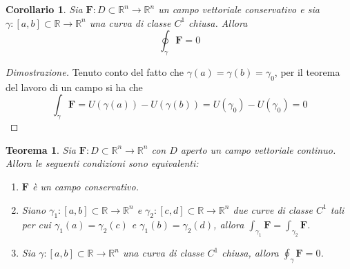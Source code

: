\documentclass{article}
\newtheorem{theorem}{Teorema}
\newtheorem{corollary}{Corollario}[theorem]
\begin{document}
            \begin{corollary}
                Sia $\mathbf{F}: D \subset \mathbb{R}^{n} \rightarrow \mathbb{R}^{n}$ un campo vettoriale conservativo e sia $\gamma: [a, b] \subset \mathbb{R} \rightarrow \mathbb{R}^{n}$ una curva di classe $C^{1}$ chiusa.
                Allora
                \[
                        \oint_{\gamma} \mathbf{F} = 0
                \]
            \end{corollary}

            \begin{proof}[Dimostrazione]
                Tenuto conto del fatto che $\gamma(a) = \gamma(b) = \gamma_{0}$, per il teorema del lavoro di un campo si ha che
                \[
                    \int_{\gamma} \mathbf{F} = U(\gamma(a)) - U(\gamma(b)) = U(\gamma_{0}) - U(\gamma_{0}) = 0
                \]
            \end{proof}
            
            \begin{theorem}
                Sia $\mathbf{F}: D \subset \mathbb{R}^{n} \rightarrow \mathbb{R}^{n}$ con $D$ aperto un campo vettoriale continuo.
                Allora le seguenti condizioni sono equivalenti:
                \begin{enumerate}[label=(\Roman*)]
                    \item $\mathbf{F}$ è un campo conservativo.
                    \item Siano $\gamma_{1}: [a, b] \subset \mathbb{R} \rightarrow \mathbb{R}^{n}$ e $\gamma_{2}: [c, d] \subset \mathbb{R} \rightarrow \mathbb{R}^{n}$ due curve di classe $C^{1}$ tali per cui $\gamma_{1}(a) = \gamma_{2}(c)$ e $\gamma_{1}(b) = \gamma_{2}(d)$, allora $\displaystyle \int_{\gamma_1} \mathbf{F} = \int_{\gamma_2} \mathbf{F}$.
                    \item Sia $\gamma: [a, b] \subset \mathbb{R} \rightarrow \mathbb{R}^{n}$ una curva di classe $C^{1}$ chiusa, allora $\displaystyle \oint_{\gamma} \mathbf{F} = 0$.
                \end{enumerate}
            \end{theorem}
\end{document}
